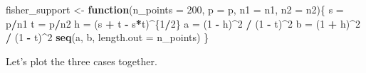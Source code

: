 \documentclass[
]{article}
\newenvironment{Shaded}{\begin{snugshade}}{\end{snugshade}}
\newcommand{\AttributeTok}[1]{\textcolor[rgb]{0.13,0.29,0.53}{#1}}
\newcommand{\ControlFlowTok}[1]{\textcolor[rgb]{0.13,0.29,0.53}{\textbf{#1}}}
\newcommand{\DecValTok}[1]{\textcolor[rgb]{0.00,0.00,0.81}{#1}}
\newcommand{\FunctionTok}[1]{\textcolor[rgb]{0.13,0.29,0.53}{\textbf{#1}}}
\newcommand{\NormalTok}[1]{#1}
\newcommand{\OtherTok}[1]{\textcolor[rgb]{0.56,0.35,0.01}{#1}}
\newcommand{\SpecialCharTok}[1]{\textcolor[rgb]{0.81,0.36,0.00}{\textbf{#1}}}
\begin{document}
\begin{Shaded}
\begin{Highlighting}[]
\NormalTok{fisher\_support }\OtherTok{\textless{}{-}} \ControlFlowTok{function}\NormalTok{(}\AttributeTok{n\_points =} \DecValTok{200}\NormalTok{, }\AttributeTok{p =}\NormalTok{ p, }\AttributeTok{n1 =}\NormalTok{ n1, }\AttributeTok{n2 =}\NormalTok{ n2)\{}
\NormalTok{  s }\OtherTok{=}\NormalTok{ p}\SpecialCharTok{/}\NormalTok{n1}
\NormalTok{  t }\OtherTok{=}\NormalTok{ p}\SpecialCharTok{/}\NormalTok{n2}
\NormalTok{  h }\OtherTok{=}\NormalTok{ (s }\SpecialCharTok{+}\NormalTok{ t }\SpecialCharTok{{-}}\NormalTok{ s}\SpecialCharTok{*}\NormalTok{t)}\SpecialCharTok{\^{}}\NormalTok{\{}\DecValTok{1}\SpecialCharTok{/}\DecValTok{2}\NormalTok{\}}
\NormalTok{  a }\OtherTok{=}\NormalTok{ (}\DecValTok{1} \SpecialCharTok{{-}}\NormalTok{ h)}\SpecialCharTok{\^{}}\DecValTok{2} \SpecialCharTok{/}\NormalTok{ (}\DecValTok{1} \SpecialCharTok{{-}}\NormalTok{ t)}\SpecialCharTok{\^{}}\DecValTok{2}
\NormalTok{  b }\OtherTok{=}\NormalTok{ (}\DecValTok{1} \SpecialCharTok{+}\NormalTok{ h)}\SpecialCharTok{\^{}}\DecValTok{2} \SpecialCharTok{/}\NormalTok{ (}\DecValTok{1} \SpecialCharTok{{-}}\NormalTok{ t)}\SpecialCharTok{\^{}}\DecValTok{2}
  \FunctionTok{seq}\NormalTok{(a, b, }\AttributeTok{length.out =}\NormalTok{ n\_points)}
\NormalTok{\}}
\end{Highlighting}
\end{Shaded}

Let's plot the three cases together.
\end{document}
